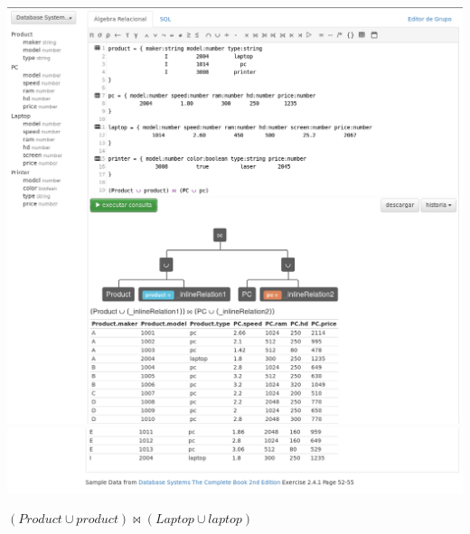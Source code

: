\documentclass[12pt, letterpaper]{article}
\begin{document}
\begin{itemize}
\begin{itemize}
\begin{center}
                                        \includegraphics[scale=0.22]{q2.png}
                                        \includegraphics[scale=0.22]{q22.png}
                                    \end{center}

                                    \begin{center}
                                        $(Product \cup product) \Join (Laptop \cup laptop)$\vspace{.3cm}


\end{center}
\end{itemize}
\end{itemize}
\end{document}
